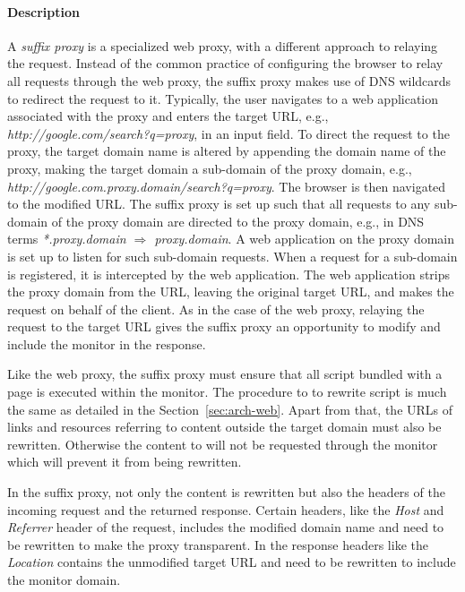 \documentclass{llncs}
\begin{document}
\paragraph{Description}
A \emph{suffix proxy} is a specialized web proxy, with a different approach to relaying the request. 
Instead of the common practice of configuring the browser to relay all requests through the web proxy,
the suffix proxy makes use of DNS wildcards to redirect the request to it.
Typically, the user navigates to a 
web application associated with the proxy and enters the target URL, e.g., \emph{http://google.com/search?q=proxy}, in 
an input field. To direct the request to the proxy, the target domain name is altered
by appending the domain name of the proxy, making the target domain a sub-domain of the proxy domain, e.g., \emph{http://google.com.proxy.domain/search?q=proxy}. 
The browser is then navigated to the modified URL.
The suffix proxy is set up such
that all requests to any sub-domain of the proxy domain are directed to the proxy domain, 
e.g., in DNS terms \emph{*.proxy.domain $\Rightarrow$ proxy.domain}. 
A web application on the proxy domain is set up to listen for such sub-domain requests.
When a request for a sub-domain is registered, it is intercepted by the web application.
The web application strips the proxy domain from the URL, leaving the original target URL, 
and makes the request on behalf of the client. As in the case of the web proxy, 
relaying the request to the target URL gives the suffix proxy an opportunity to modify and 
include the monitor in the response.

Like the web proxy, the suffix proxy must ensure that all script bundled with a 
page is executed within the monitor. The procedure to to rewrite script is much the same as 
detailed in the Section~\ref{sec:arch-web}. Apart from that, the URLs of links and 
resources referring to content outside the target domain must also be rewritten. 
Otherwise the content to will not be requested through the monitor which will 
prevent it from being rewritten.


In the suffix proxy, not only the content is rewritten
but also the headers of the incoming request and the returned response.
Certain headers, like the \emph{Host} and \emph{Referrer} header of the request, includes the 
modified domain name and need to be rewritten to make the proxy transparent. In 
the response headers like the \emph{Location} contains the unmodified target URL and 
need to be rewritten to include the monitor domain. 
\end{document}
